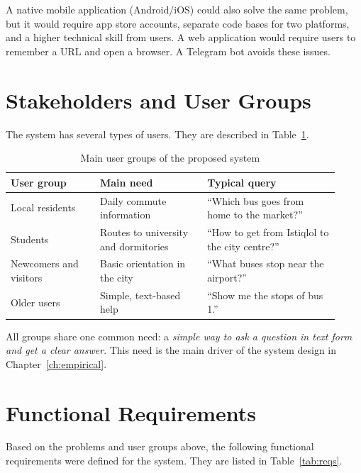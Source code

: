 A native mobile application (Android/iOS) could also solve the same
problem, but it would require app store accounts, separate code bases
for two platforms, and a higher technical skill from users. A web
application would require users to remember a URL and open a browser.
A Telegram bot avoids these issues.

\section{Stakeholders and User Groups}
\label{sec:stakeholders}

The system has several types of users. They are described in
Table~\ref{tab:users}.

\begin{table}[H]
\centering
\caption{Main user groups of the proposed system}
\label{tab:users}
\begin{tabular}{p{0.25\linewidth} p{0.30\linewidth} p{0.37\linewidth}}
\hline
\textbf{User group} & \textbf{Main need} & \textbf{Typical query} \\
\hline
Local residents & Daily commute information & ``Which bus goes from
home to the market?'' \\
Students & Routes to university and dormitories & ``How to get from
Istiqlol to the city centre?'' \\
Newcomers and visitors & Basic orientation in the city & ``What buses
stop near the airport?'' \\
Older users & Simple, text-based help & ``Show me the stops of bus 1.''
\\
\hline
\end{tabular}
\end{table}

All groups share one common need: a \emph{simple way to ask a question
in text form and get a clear answer}. This need is the main driver of
the system design in Chapter~\ref{ch:empirical}.

\section{Functional Requirements}
\label{sec:requirements}

Based on the problems and user groups above, the following functional
requirements were defined for the system. They are listed in
Table~\ref{tab:reqs}.

